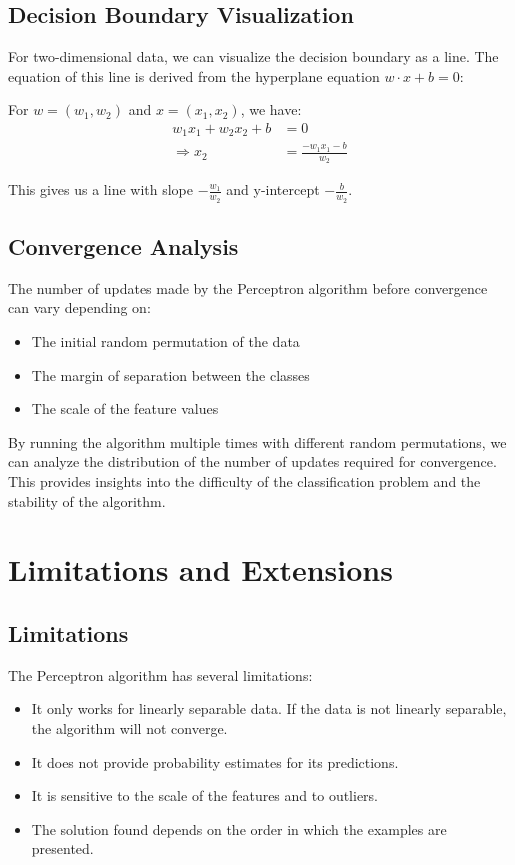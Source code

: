 \documentclass{article}
\begin{document}
\subsection{Decision Boundary Visualization}

For two-dimensional data, we can visualize the decision boundary as a line. The equation of this line is derived from the hyperplane equation $w \cdot x + b = 0$:

For $w = (w_1, w_2)$ and $x = (x_1, x_2)$, we have:
\begin{align}
w_1 x_1 + w_2 x_2 + b &= 0 \\
\Rightarrow x_2 &= \frac{-w_1 x_1 - b}{w_2}
\end{align}

This gives us a line with slope $-\frac{w_1}{w_2}$ and y-intercept $-\frac{b}{w_2}$.

\subsection{Convergence Analysis}

The number of updates made by the Perceptron algorithm before convergence can vary depending on:
\begin{itemize}
    \item The initial random permutation of the data
    \item The margin of separation between the classes
    \item The scale of the feature values
\end{itemize}

By running the algorithm multiple times with different random permutations, we can analyze the distribution of the number of updates required for convergence. This provides insights into the difficulty of the classification problem and the stability of the algorithm.

\section{Limitations and Extensions}

\subsection{Limitations}

The Perceptron algorithm has several limitations:
\begin{itemize}
    \item It only works for linearly separable data. If the data is not linearly separable, the algorithm will not converge.
    \item It does not provide probability estimates for its predictions.
    \item It is sensitive to the scale of the features and to outliers.
    \item The solution found depends on the order in which the examples are presented.
\end{itemize}
\end{document}
